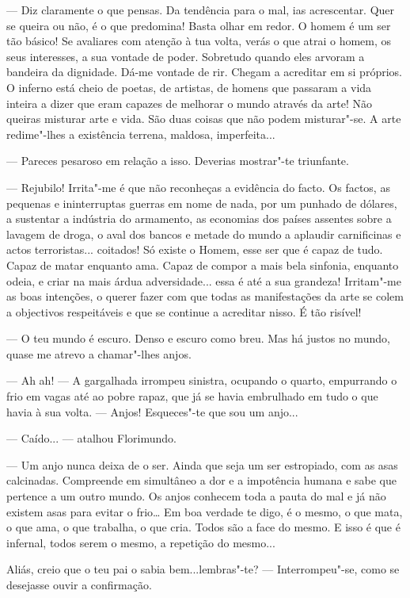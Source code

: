 --- Diz claramente o que pensas. Da tendência para o mal, ias acrescentar.
Quer se queira ou não, é o que predomina! Basta olhar em redor. O homem
é um ser tão básico! Se avaliares com atenção à tua volta, verás o que
atrai o homem, os seus interesses, a sua vontade de poder. Sobretudo
quando eles arvoram a bandeira da dignidade. Dá-me vontade de rir.
Chegam a acreditar em si próprios. O inferno está cheio de poetas, de
artistas, de homens que passaram a vida inteira a dizer que eram capazes
de melhorar o mundo através da arte! Não queiras misturar arte e vida.
São duas coisas que não podem misturar"-se. A arte redime"-lhes a
existência terrena, maldosa, imperfeita...

--- Pareces pesaroso em relação a isso. Deverias mostrar"-te triunfante.

--- Rejubilo! Irrita"-me é que não reconheças a evidência do facto. Os
factos, as pequenas e ininterruptas guerras em nome de nada, por um
punhado de dólares, a sustentar a indústria do armamento, as economias
dos países assentes sobre a lavagem de droga, o aval dos bancos e metade
do mundo a aplaudir carnificinas e actos terroristas... coitados! Só
existe o Homem, esse ser que é capaz de tudo. Capaz de matar enquanto
ama. Capaz de compor a mais bela sinfonia, enquanto odeia, e criar na
mais árdua adversidade... essa é até a sua grandeza! Irritam"-me as boas
intenções, o querer fazer com que todas as manifestações da arte se
colem a objectivos respeitáveis e que se continue a acreditar nisso. É
tão risível!

--- O teu mundo é escuro. Denso e escuro como breu. Mas há justos no
mundo, quase me atrevo a chamar"-lhes anjos.

--- Ah ah! --- A gargalhada irrompeu sinistra, ocupando o quarto, empurrando
o frio em vagas até ao pobre rapaz, que já se havia embrulhado em tudo o
que havia à sua volta. --- Anjos! Esqueces"-te que sou um anjo...

--- Caído... --- atalhou Florimundo.

--- Um anjo nunca deixa de o ser. Ainda que seja um ser estropiado, com as
asas calcinadas. Compreende em simultâneo a dor e a impotência humana e
sabe que pertence a um outro mundo. Os anjos conhecem toda a pauta do
mal e já não existem asas para evitar o frio\ldots{} Em boa verdade te
digo, é o mesmo, o que mata, o que ama, o que trabalha, o que cria.
Todos são a face do mesmo. E isso é que é infernal, todos serem o mesmo,
a repetição do mesmo...

Aliás, creio que o teu pai o sabia bem...lembras"-te? --- Interrompeu"-se,
como se desejasse ouvir a confirmação.

